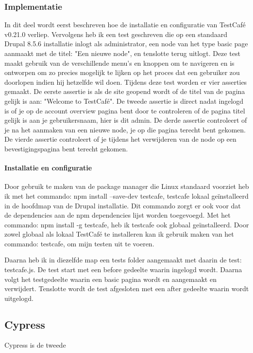 \subsubsection{Implementatie}
In dit deel wordt eerst beschreven hoe de installatie en configuratie van TestCafé v0.21.0 verliep. Vervolgens heb ik een test geschreven die op een standaard Drupal 8.5.6 installatie inlogt als administrator, een node van het type basic page aanmaakt met de titel: "Een nieuwe node", en tenslotte terug uitlogt. Deze test maakt gebruik van de verschillende menu's en knoppen om te navigeren en is ontworpen om zo precies mogelijk te lijken op het proces dat een gebruiker zou doorlopen indien hij hetzelfde wil doen. Tijdens deze test worden er vier asserties gemaakt. De eerste assertie is als de site geopend wordt of de titel van de pagina gelijk is aan: "Welcome to TestCafé". De tweede assertie is direct nadat ingelogd is of je op de account overview pagina bent door te controleren of de pagina titel gelijk is aan je gebruikersnaam, hier is dit admin. De derde assertie controleert of je na het aanmaken van een nieuwe node, je op die pagina terecht bent gekomen. De vierde assertie controleert of je tijdens het verwijderen van de node op een bevestigingspagina bent terecht gekomen.

\paragraph{Installatie en configuratie}
Door gebruik te maken van de package manager die Linux standaard voorziet heb ik met het commando: npm install --save-dev testcafe, testcafe lokaal geïnstalleerd in de hoofdmap van de Drupal installatie. Dit commando zorgt er ook voor dat de dependencies aan de npm dependencies lijst worden toegevoegd. Met het commando: npm install -g testcafe, heb ik testcafe ook globaal geïnstalleerd. Door zowel globaal als lokaal TestCafé te installeren kan ik gebruik maken van het commando: testcafe, om mijn testen uit te voeren.

Daarna heb ik in diezelfde map een tests folder aangemaakt met daarin de test: testcafe.js. De test start met een before gedeelte waarin ingelogd wordt. Daarna volgt het testgedeelte waarin een basic pagina wordt en aangemaakt en verwijdert. Tenslotte wordt de test afgesloten met een after gedeelte waarin wordt uitgelogd.


\subsection{Cypress}
Cypress is de tweede 



